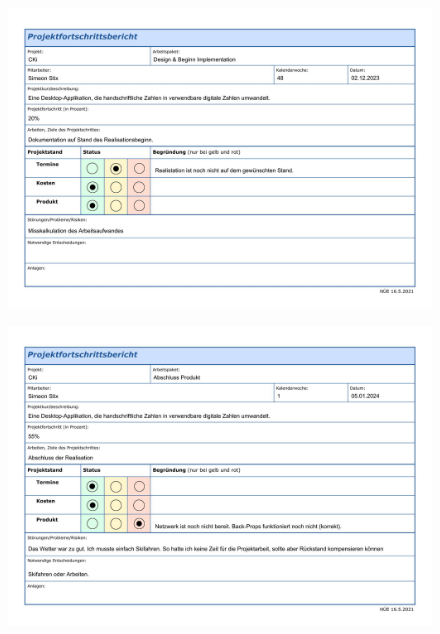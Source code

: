 \documentclass[a4paper,oneside,12pt]{report}
\begin{document}
\begin{appendices}
\begin{figure}[htbp]
\end{figure}
\begin{figure}[htbp]
	\centering
	\includegraphics[width=\linewidth, height=\textheight, keepaspectratio]{Fortschrittsbericht_03_Stix_2023-12-02-1.jpg}
\end{figure}
\begin{figure}[htbp]
	\centering
	\includegraphics[width=\linewidth, height=\textheight, keepaspectratio]{Fortschrittsbericht_04_Stix_2024-01-05-1.jpg}
\end{figure}
\begin{figure}[htbp]
	\centering

\end{figure}
\end{appendices}
\end{document}

